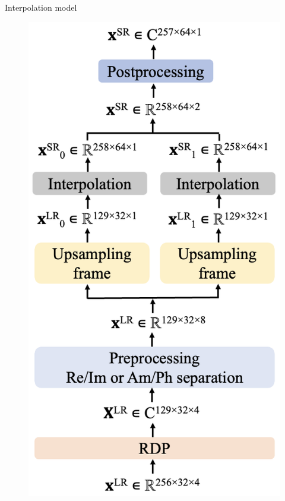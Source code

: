 \documentclass{beamer}
\begin{document}
\begin{frame}[t]{Interpolation model}

    \begin{figure}
        \centering
        \begin{minipage}{0.59\textwidth}
            \centering
            \includegraphics[height=1.07\textwidth]{MA_presentation/figures/interpolation_left.png}
        \end{minipage}
        \begin{minipage}{0.39\textwidth}
            \centering

\end{minipage}
\end{figure}
\end{frame}
\end{document}
